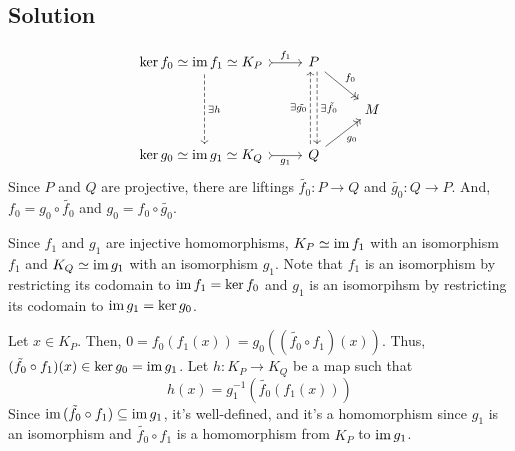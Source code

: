 \documentclass{article}
\newcommand{\im}{\textnormal{im}\,}
\begin{document}
\subsection*{Solution}
\[\begin{tikzcd}
  \ker f_0 \simeq \im f_1 \simeq K_P
  \arrow[dd, dashed, shift left, "\exists h"]
  \ar[>->, "f_1"]{r} & P \ar[->>, "f_0"]{rd}
  \arrow[dd, dashed, shift left, "\exists\tilde{f_0}"]
  & \\
  & & M \\
  \ker g_0 \simeq \im g_1 \simeq K_Q
  \ar[>->, swap, "g_1"]{r} & Q \ar[->>, swap, "g_0"]{ru}
  \arrow[uu, dashed, shift left, "\exists\tilde{g_0}"]
  & 
\end{tikzcd}\]
Since \(P\) and \(Q\) are projective, there are liftings \(\tilde{f_0}: P \to Q\) and \(\tilde{g_0}: Q \to P\).
And, \(f_0 = g_0 \circ \tilde{f_0}\) and \(g_0 = f_0 \circ \tilde{g_0}\).

Since \(f_1\) and \(g_1\) are injective homomorphisms, \(K_P \simeq \im f_1\) with an isomorphism \(f_1\) and \(K_Q \simeq \im g_1\) with an isomorphism \(g_1\).
Note that \(f_1\) is an isomorphism by restricting its codomain to \(\im f_1 = \ker f_0\) and \(g_1\) is an isomorpihsm by restricting its codomain to \(\im g_1 = \ker g_0\).

Let \(x \in K_P\). Then, \(0 = f_0(f_1(x)) = g_0((\tilde{f_0} \circ f_1)(x))\).
Thus, \((\tilde{f_0} \circ f_1)(x) \in \ker g_0 = \im g_1\).
Let \(h: K_P \to K_Q\) be a map such that
\[h(x) = g_1^{-1}(\tilde{f_0}(f_1(x)))\]
Since \(\im (\tilde{f_0} \circ f_1) \subseteq \im g_1\), it's well-defined, and it's a homomorphism since \(g_1\) is an isomorphism and \(\tilde{f_0} \circ f_1\) is a homomorphism from \(K_P\) to \(\im g_1\).
\end{document}

